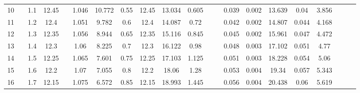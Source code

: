 \documentclass[a4paper,12pt]{article}
\begin{document}
\begin{table}[htp]
\begin{adjustwidth}{-3.5cm}{}
\begin{tabular}{|c|c|c|c|c|c|c|c|c|c|c|c|c|c|c|c|c|c|c|c|c|}
10    &                      & 1.1 & 12.45 &                       & 1.046 & 10.772  & 0.55 & 12.45 & 13.034 & 0.605 &                        &                         & 0.039     & 0.002     & 13.639 & 0.04   & 3.856      &                         &                         &                         \\ \cline{1-1} \cline{3-4} \cline{6-11} \cline{14-18}
11    &                      & 1.2 & 12.4  &                       & 1.051 & 9.782   & 0.6  & 12.4  & 14.087 & 0.72  &                        &                         & 0.042     & 0.002     & 14.807 & 0.044  & 4.168      &                         &                         &                         \\ \cline{1-1} \cline{3-4} \cline{6-11} \cline{14-18}
12    &                      & 1.3 & 12.35 &                       & 1.056 & 8.944   & 0.65 & 12.35 & 15.116 & 0.845 &                        &                         & 0.045     & 0.002     & 15.961 & 0.047  & 4.472      &                         &                         &                         \\ \cline{1-1} \cline{3-4} \cline{6-11} \cline{14-18}
13    &                      & 1.4 & 12.3  &                       & 1.06  & 8.225   & 0.7  & 12.3  & 16.122 & 0.98  &                        &                         & 0.048     & 0.003     & 17.102 & 0.051  & 4.77       &                         &                         &                         \\ \cline{1-1} \cline{3-4} \cline{6-11} \cline{14-18}
14    &                      & 1.5 & 12.25 &                       & 1.065 & 7.601   & 0.75 & 12.25 & 17.103 & 1.125 &                        &                         & 0.051     & 0.003     & 18.228 & 0.054  & 5.06       &                         &                         &                         \\ \cline{1-1} \cline{3-4} \cline{6-11} \cline{14-18}
15    &                      & 1.6 & 12.2  &                       & 1.07  & 7.055   & 0.8  & 12.2  & 18.06  & 1.28  &                        &                         & 0.053     & 0.004     & 19.34  & 0.057  & 5.343      &                         &                         &                         \\ \cline{1-1} \cline{3-4} \cline{6-11} \cline{14-18}
16    &                      & 1.7 & 12.15 &                       & 1.075 & 6.572   & 0.85 & 12.15 & 18.993 & 1.445 &                        &                         & 0.056     & 0.004     & 20.438 & 0.06   & 5.619      &                         &                         &                         \\ \cline{1-1} \cline{3-4} \cline{6-11} \cline{14-18}

\end{tabular}
\end{adjustwidth}
\end{table}
\end{document}
